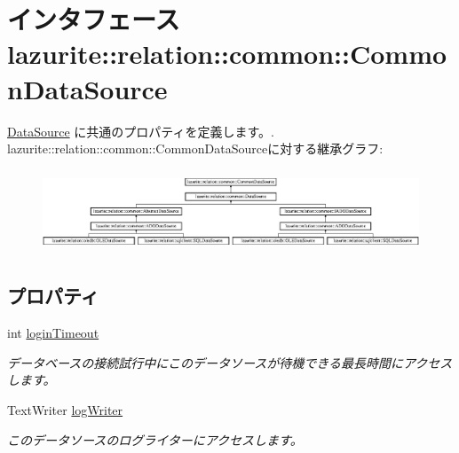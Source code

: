 \hypertarget{interfacelazurite_1_1relation_1_1common_1_1_common_data_source}{
\section{インタフェース lazurite::relation::common::CommonDataSource}
\label{interfacelazurite_1_1relation_1_1common_1_1_common_data_source}
}


\hyperlink{interfacelazurite_1_1relation_1_1common_1_1_data_source}{DataSource} に共通のプロパティを定義します。.  
lazurite::relation::common::CommonDataSourceに対する継承グラフ:\begin{figure}[H]
\begin{center}
\leavevmode
\includegraphics[height=2.48227cm]{interfacelazurite_1_1relation_1_1common_1_1_common_data_source}
\end{center}
\end{figure}
\subsection*{プロパティ}
\begin{DoxyCompactItemize}
\item 
int \hyperlink{interfacelazurite_1_1relation_1_1common_1_1_common_data_source_a3fa02340190e1fed4b3cc28d87ce6908}{loginTimeout}
\begin{DoxyCompactList}\small\item\em データベースの接続試行中にこのデータソースが待機できる最長時間にアクセスします。 \item\end{DoxyCompactList}\item 
TextWriter \hyperlink{interfacelazurite_1_1relation_1_1common_1_1_common_data_source_a727c10810a495b3264cd6bda3417522e}{logWriter}
\begin{DoxyCompactList}\small\item\em このデータソースのログライターにアクセスします。 \item\end{DoxyCompactList}\end{DoxyCompactItemize}


